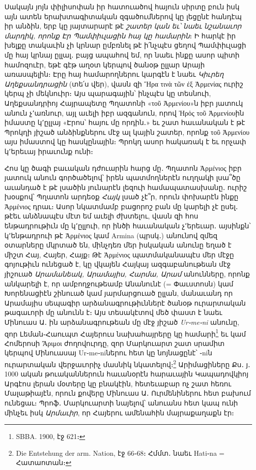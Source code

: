 \documentclass{article}
\begin{document}
{Սակայն յոյն փիլիսոփան իր հատուածով հայուն սիրտը բուն իսկ այն ատեն երախտագիտական զգածումներով կը լեցընէ հանդէպ իր անձին, երբ կը յայտարարէ թէ \emph{շատեր կան եւ՝ նաեւ նշանաւոր մարդիկ, որոնք Էր Պամփիւլացին հայ կը համարին}։ Ի հարկէ իր խելքը տակաւին չի կրնար ըմբռնել թէ ի՛նչպէս ցեղով Պամփիւլացի մը հայ կրնայ ըլլալ․ բայց ապահով եմ, որ նաեւ ինքը ասոր պիտի համոզուէր, եթէ գէթ աղօտ կերպով ծանօթ ըլլար Արայի առասպելին։ Էրը հայ համարողներու կարգէն է նաեւ \emph{Կիւրեղ Աղեքսանդրացին} (տե՛ս վեր), վասն զի Ἤρα τινὰ τῶν ἐξ Ἀρμενίας ուրիշ կերպ չի մեկնուիր։ Այս պարագային՝ ինչպէս կը տեսնուի, Աղեքսանդրիոյ Հայրապետը Պղատոնի «τοῦ Ἀρμενίου»ն իբր յատուկ անուն չ՚առնուր, այլ աւելի իբր ազգանուն, որով Ἠρὁς τοῦ Ἀρμενίουին իմաստը կ՚ըլլայ «Էրոս՝ հայու մը որդին․» եւ շատ հաւանական է թէ Պրոկղի յիշած անձինքներու մէջ ալ կային շատեր, որոնք τοῦ Ἀρμενίου այս իմաստով կը հասկընային։ Պրոկղ ասոր հակառակ է եւ որչափ կ՚երեւայ իրաւունք ունի։

Հոս կը ծագի բաւական դժուարին հարց մը․ Պղատոն Ἀρμένιος իբր յատուկ անուն գործածելով՝ իրեն պատմողներէն ուղղակի լսա՞ծը աւանդած է թէ լսածին յունարէն լեզուի համապատասխանը․ ուրիշ խօսքով՝ Պղատոն արդեօք \emph{Հայկ} լսած չէ՞ր, որուն փոխարէն ինքը Ἀρμένιος դրաւ։ Ասոր նկատմամբ բացորոշ բան մը կարելի չէ ըսել․ թէեւ անձնապէս մէտ եմ աւելի ժխտելու, վասն զի հոս ենթադրութիւն մը կ՚ըլլուի, որ ինծի հաւանական չ՚երեւար․ այսինքն՝ կ՚ենթադրուի թէ Ἀρμένιος կամ Armina (պրսկ․) անունով զմեզ օտարները մկրտած են, մինչդեռ մեր իսկական անունը եղած է միշտ Հայ, Հայեր, Հայք։ Թէ Ἀρμένιος պատմականապէս մեր մէջը գոյութիւն ունեցած է, կը վկայեն Հայկայ ազգաբանութեան մէջ յիշուած \emph{Արամանեակ, Արամայիս, Հարմա, Արամ} անունները, որոնք անկարելի է, որ ամբողջութեամբ Անանունէ (= Փաւստոսն) կամ Խորենացիէն շինուած կամ յարմարցուած ըլլան, մանաւանդ որ Արամայիս սեպագիր արձանագրութիւններէ ծանօթ ուրարտական թագաւորի մը անունն է։ Այս տեսակէտով մեծ փաստ է նաեւ Մինուաս Ա․ ին արձանագրութեան մը մէջ յիշած \emph{Ur֊me֊ni} անունը, զոր Լեման֊Հաուպտ Հայերուս նախահայրերը կը համարի\footnote{SBBA. 1900, էջ 621։} եւ կամ Հոմերոսի Ἄριμοι ժողովուրդը, զոր Մարկուարտ շատ սրամիտ կերպով Մինուասայ Ur֊me֊niներու հետ կը նոյնացընէ՝ ֊niն ուրարտական վերջաւորիչ մասնիկ նկատելով։\footnote{Die Entstehung der arm. Nation, էջ 66֊68։ Հմմտ․ նաեւ Hati֊na = Հատաոտան։} Արիմացիները Քս․ յ․ 1000 ական թուականներուն հաւանօրէն հարաւային Կապադովկիոյ Արգէոս լերան մօտերը կը բնակէին, հետեւաբար ոչ շատ հեռու Մալաթիայէն, որուն քովերը Մինուաս Ա․ Ուրմենիներու հետ բախում ունեցաւ։ Պրոֆ․ Մարկուարտի նայելով՝ անուանս հետ կապ ունի մինչեւ իսկ \emph{Արմաւիր}, որ Հայերու ամենահին մայրաքաղաքն էր։

}
\end{document}
